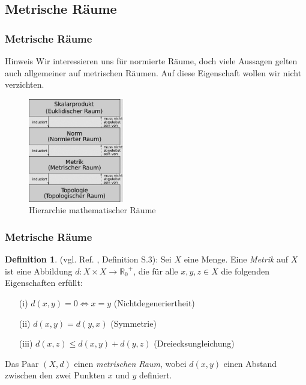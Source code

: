 \documentclass[t, handout]{beamer}
\newcommand{\R}{\mathbb{R}}
\theoremstyle{definition} %
\newtheorem{dfi}[sa]{Definition} %
\begin{document}
\subsection{Metrische Räume}

\begin{frame}
\frametitle{Metrische Räume}
\begin{block}{Hinweis}
Wir interessieren uns für normierte Räume, doch viele Aussagen gelten auch allgemeiner auf metrischen Räumen. Auf diese Eigenschaft wollen wir nicht verzichten.
\end{block}
\begin{figure}
\includegraphics[width=0.37\textwidth]{pictures/hirarchie.png}
\caption{Hierarchie mathematischer Räume \cite{Hirarchie}}
\end{figure}
\end{frame}

\begin{frame}
\frametitle{Metrische Räume}
\begin{dfi}
(vgl. Ref. \cite{Forster}, Definition S.3): Sei $X$ eine Menge.  Eine \textit{Metrik} auf $X$ ist eine Abbildung $d : X \times X \rightarrow {\R_0}^+$, die für alle $x, y, z \in X$ die folgenden Eigenschaften erfüllt:
\begin{itemize}
\item[(i)] $d(x, y) = 0 \Leftrightarrow x = y$ (Nichtdegeneriertheit)
\item[(ii)] $d(x, y) = d(y, x)$ (Symmetrie)
\item[(iii)] $d(x, z) \leq d(x, y) + d(y, z)$ (Dreiecksungleichung)
\end{itemize}
Das Paar $(X, d)$ einen \textit{metrischen Raum}, wobei $d(x,y)$ einen Abstand zwischen den zwei Punkten $x$ und $y$ definiert.
\end{dfi}
\end{frame}

\end{document}
